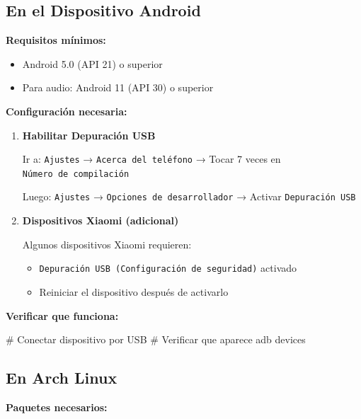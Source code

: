 \documentclass[
  doc,
  floatsintext,
  longtable,
  a4paper,
  nolmodern,
  notxfonts,
  notimes,
  12pt,
  colorlinks=true,linkcolor=blue,citecolor=blue,urlcolor=blue]{apa7}
\newenvironment{Shaded}{\begin{snugshade}}{\end{snugshade}}
\newcommand{\CommentTok}[1]{\textcolor[rgb]{0.37,0.37,0.37}{#1}}
\newcommand{\ExtensionTok}[1]{\textcolor[rgb]{0.00,0.23,0.31}{#1}}
\newcommand{\NormalTok}[1]{\textcolor[rgb]{0.00,0.23,0.31}{#1}}
\providecommand{\tightlist}{%
  \setlength{\itemsep}{0pt}\setlength{\parskip}{0pt}}
\begin{document}
\subsection{En el Dispositivo Android}\label{en-el-dispositivo-android}

\textbf{Requisitos mínimos:}

\begin{itemize}
\tightlist
\item
  Android 5.0 (API 21) o superior
\item
  Para audio: Android 11 (API 30) o superior
\end{itemize}

\textbf{Configuración necesaria:}

\begin{enumerate}
\def\labelenumi{\arabic{enumi}.}
\item
  \textbf{Habilitar Depuración USB}

  Ir a: \texttt{Ajustes} → \texttt{Acerca\ del\ teléfono} → Tocar 7
  veces en \texttt{Número\ de\ compilación}

  Luego: \texttt{Ajustes} → \texttt{Opciones\ de\ desarrollador} →
  Activar \texttt{Depuración\ USB}
\item
  \textbf{Dispositivos Xiaomi (adicional)}

  Algunos dispositivos Xiaomi requieren:

  \begin{itemize}
  \tightlist
  \item
    \texttt{Depuración\ USB\ (Configuración\ de\ seguridad)} activado
  \item
    Reiniciar el dispositivo después de activarlo
  \end{itemize}
\end{enumerate}

\textbf{Verificar que funciona:}

\begin{Shaded}
\begin{Highlighting}[]
\CommentTok{\# Conectar dispositivo por USB}
\CommentTok{\# Verificar que aparece}
\ExtensionTok{adb}\NormalTok{ devices}
\end{Highlighting}
\end{Shaded}

\subsection{En Arch Linux}\label{en-arch-linux}

\textbf{Paquetes necesarios:}
\end{document}
